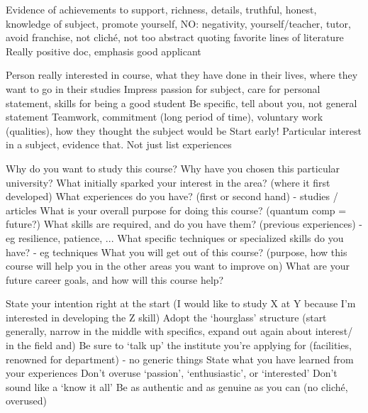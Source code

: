 \documentclass[11pt]{article}
\newcommand*{\NEWLINE}{\vspace{0.75em}}
\begin{document}
Evidence of achievements to support, richness, details, truthful, honest, knowledge of subject, promote yourself, 
NO: negativity, yourself/teacher, tutor, avoid franchise, not cliché, not too abstract quoting favorite lines of literature
Really positive doc, emphasis good applicant
\NEWLINE{}

Person really interested in course, what they have done in their lives, where they want to go in their studies
Impress passion for subject, care for personal statement, skills for being a good student
Be specific, tell about you, not general statement
Teamwork, commitment (long period of time), voluntary work (qualities), how they thought the subject would be
Start early! Particular interest in a subject, evidence that. Not just list experiences
\NEWLINE{}

Why do you want to study this course?
Why have you chosen this particular university?
What initially sparked your interest in the area? (where it first developed)
What experiences do you have? (first or second hand) - studies / articles
What is your overall purpose for doing this course? (quantum comp = future?)
What skills are required, and do you have them? (previous experiences) - eg resilience, patience, ...
What specific techniques or specialized skills do you have? - eg techniques
What you will get out of this course? (purpose, how this course will help you in the other areas you want to improve on)
What are your future career goals, and how will this course help?
\NEWLINE{}

State your intention right at the start (I would like to study X at Y because I’m interested in developing the Z skill)
Adopt the ‘hourglass’ structure (start generally, narrow in the middle with specifics, expand out again about interest/ in the field and)
Be sure to ‘talk up’ the institute you’re applying for (facilities, renowned for department) - no generic things
State what you have learned from your experiences
Don’t overuse ‘passion’, ‘enthusiastic’, or ‘interested’
Don’t sound like a ‘know it all’
Be as authentic and as genuine as you can (no cliché, overused)
\NEWLINE{}
\end{document}
